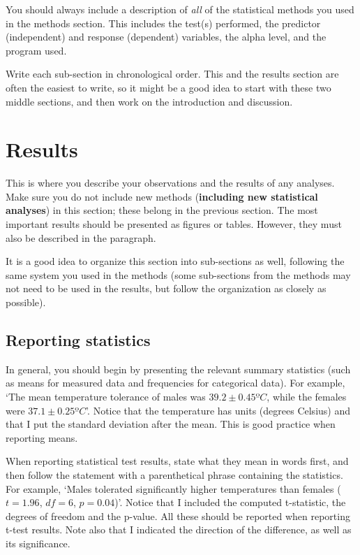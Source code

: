 \documentclass[]{book}
\begin{document}
You should always include a description of \emph{all} of the statistical
methods you used in the methods section. This includes the test(s)
performed, the predictor (independent) and response (dependent)
variables, the alpha level, and the program used.

Write each sub-section in chronological order. This and the results
section are often the easiest to write, so it might be a good idea to
start with these two middle sections, and then work on the introduction
and discussion.

\section{Results}\label{results}

This is where you describe your observations and the results of any
analyses. Make sure you do not include new methods (\textbf{including
new statistical analyses}) in this section; these belong in the previous
section. The most important results should be presented as figures or
tables. However, they must also be described in the paragraph.

It is a good idea to organize this section into sub-sections as well,
following the same system you used in the methods (some sub-sections
from the methods may not need to be used in the results, but follow the
organization as closely as possible).

\subsection{Reporting statistics}\label{reporting-statistics}

In general, you should begin by presenting the relevant summary
statistics (such as means for measured data and frequencies for
categorical data). For example, `The mean temperature tolerance of males
was \(39.2 \pm 0.45 ºC\), while the females were \(37.1 \pm 0.25 ºC\)'.
Notice that the temperature has units (degrees Celsius) and that I put
the standard deviation after the mean. This is good practice when
reporting means.

When reporting statistical test results, state what they mean in words
first, and then follow the statement with a parenthetical phrase
containing the statistics. For example, `Males tolerated significantly
higher temperatures than females (\(t = 1.96\), \(df = 6\),
\(p = 0.04\))'. Notice that I included the computed t-statistic, the
degrees of freedom and the p-value. All these should be reported when
reporting t-test results. Note also that I indicated the direction of
the difference, as well as its significance.
\end{document}
